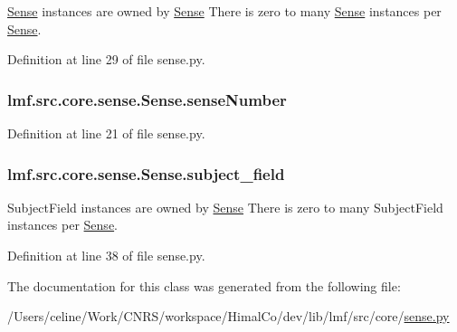 \hyperlink{classlmf_1_1src_1_1core_1_1sense_1_1_sense}{Sense} instances are owned by \hyperlink{classlmf_1_1src_1_1core_1_1sense_1_1_sense}{Sense} There is zero to many \hyperlink{classlmf_1_1src_1_1core_1_1sense_1_1_sense}{Sense} instances per \hyperlink{classlmf_1_1src_1_1core_1_1sense_1_1_sense}{Sense}. 



Definition at line 29 of file sense.\+py.

\hypertarget{classlmf_1_1src_1_1core_1_1sense_1_1_sense_ab511b70da3012cc5a0254f34dd30170c}{
\subsubsection[{sense\+Number}]{\setlength{\rightskip}{0pt plus 5cm}lmf.\+src.\+core.\+sense.\+Sense.\+sense\+Number}}\label{classlmf_1_1src_1_1core_1_1sense_1_1_sense_ab511b70da3012cc5a0254f34dd30170c}


Definition at line 21 of file sense.\+py.

\hypertarget{classlmf_1_1src_1_1core_1_1sense_1_1_sense_a1a7524732c66093f7156792292d3c9c3}{
\subsubsection[{subject\+\_\+field}]{\setlength{\rightskip}{0pt plus 5cm}lmf.\+src.\+core.\+sense.\+Sense.\+subject\+\_\+field}}\label{classlmf_1_1src_1_1core_1_1sense_1_1_sense_a1a7524732c66093f7156792292d3c9c3}


Subject\+Field instances are owned by \hyperlink{classlmf_1_1src_1_1core_1_1sense_1_1_sense}{Sense} There is zero to many Subject\+Field instances per \hyperlink{classlmf_1_1src_1_1core_1_1sense_1_1_sense}{Sense}. 



Definition at line 38 of file sense.\+py.



The documentation for this class was generated from the following file\+:\begin{DoxyCompactItemize}
\item 
/\+Users/celine/\+Work/\+C\+N\+R\+S/workspace/\+Himal\+Co/dev/lib/lmf/src/core/\hyperlink{sense_8py}{sense.\+py}\end{DoxyCompactItemize}
